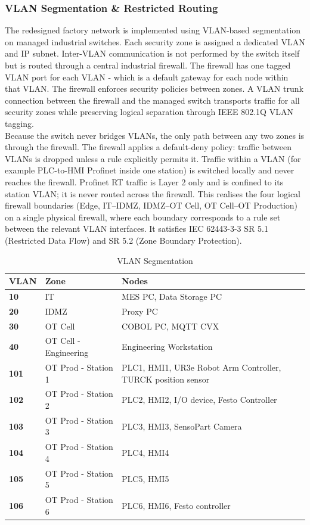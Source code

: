 \documentclass[11pt,a4paper]{article}
\renewcommand{\arraystretch}{1.15}
\begin{document}
\subsubsection{VLAN Segmentation \& Restricted Routing}
The redesigned factory network is implemented using VLAN-based segmentation on
managed industrial switches. Each security zone is assigned a dedicated VLAN
and IP subnet. Inter-VLAN communication is not performed by the switch itself
but is routed through a central industrial firewall. The firewall has one
tagged VLAN port for each VLAN - which is a default gateway for each node
within that VLAN. The firewall enforces security policies between zones. A
VLAN trunk connection between the firewall and the managed switch transports
traffic for all security zones while preserving logical separation through IEEE
802.1Q VLAN tagging. \\ Because the switch never bridges VLANs, the only path
between any two zones is through the firewall. The firewall applies a
default-deny policy: traffic between VLANs is dropped unless a rule explicitly
permits it. Traffic within a VLAN (for example PLC-to-HMI Profinet inside one
station) is switched locally and never reaches the firewall. Profinet RT
traffic is Layer 2 only and is confined to its station VLAN; it is never routed
across the firewall. This realises the four logical firewall boundaries (Edge,
IT–IDMZ, IDMZ–OT Cell, OT Cell–OT Production) on a single physical firewall,
where each boundary corresponds to a rule set between the relevant VLAN
interfaces. It satisfies IEC 62443-3-3 SR 5.1 (Restricted Data Flow) and SR 5.2
(Zone Boundary Protection).
\vspace{2em}
\begin{table}[htbp]
\renewcommand{\arraystretch}{1.3} %
\begin{tabularx}{\textwidth}{>{\bfseries}p{2.5cm} X X}
    VLAN & \textbf{Zone} & \textbf{Nodes} \vspace{0.5em}\\
\toprule
    10 & IT & MES PC, Data Storage PC \\
    20 & IDMZ & Proxy PC\\
    30 & OT Cell & COBOL PC, MQTT CVX \\
    40 & OT Cell - Engineering & Engineering Workstation  \\
    101 & OT Prod - Station 1 & PLC1, HMI1, UR3e Robot Arm Controller, TURCK position sensor \\
    102 & OT Prod - Station 2 & PLC2, HMI2, I/O device, Festo Controller \\
    103 & OT Prod - Station 3 & PLC3, HMI3, SensoPart Camera \\
    104 & OT Prod - Station 4 & PLC4, HMI4 \\
    105 & OT Prod - Station 5 & PLC5, HMI5 \\
    106 & OT Prod - Station 6 & PLC6, HMI6, Festo controller \\
\end{tabularx}
    \caption{VLAN Segmentation}
\end{table}
\end{document}
